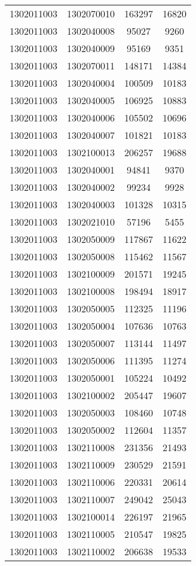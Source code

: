 \begin{longtable}{llcc}
1302011003 & 1302070010 & 163297 & 16820\\
1302011003 & 1302040008 & 95027 & 9260\\
1302011003 & 1302040009 & 95169 & 9351\\
1302011003 & 1302070011 & 148171 & 14384\\
1302011003 & 1302040004 & 100509 & 10183\\
1302011003 & 1302040005 & 106925 & 10883\\
1302011003 & 1302040006 & 105502 & 10696\\
1302011003 & 1302040007 & 101821 & 10183\\
1302011003 & 1302100013 & 206257 & 19688\\
1302011003 & 1302040001 & 94841 & 9370\\
1302011003 & 1302040002 & 99234 & 9928\\
1302011003 & 1302040003 & 101328 & 10315\\
1302011003 & 1302021010 & 57196 & 5455\\
1302011003 & 1302050009 & 117867 & 11622\\
1302011003 & 1302050008 & 115462 & 11567\\
1302011003 & 1302100009 & 201571 & 19245\\
1302011003 & 1302100008 & 198494 & 18917\\
1302011003 & 1302050005 & 112325 & 11196\\
1302011003 & 1302050004 & 107636 & 10763\\
1302011003 & 1302050007 & 113144 & 11497\\
1302011003 & 1302050006 & 111395 & 11274\\
1302011003 & 1302050001 & 105224 & 10492\\
1302011003 & 1302100002 & 205447 & 19607\\
1302011003 & 1302050003 & 108460 & 10748\\
1302011003 & 1302050002 & 112604 & 11357\\
1302011003 & 1302110008 & 231356 & 21493\\
1302011003 & 1302110009 & 230529 & 21591\\
1302011003 & 1302110006 & 220331 & 20614\\
1302011003 & 1302110007 & 249042 & 25043\\
1302011003 & 1302100014 & 226197 & 21965\\
1302011003 & 1302110005 & 210547 & 19825\\
1302011003 & 1302110002 & 206638 & 19533\\

\end{longtable}
